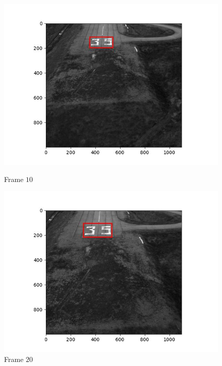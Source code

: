 \begin{figure}[H]
\begin{minipage}{.49\textwidth}
    \includegraphics[width=\textwidth]{./figures/lk_affine/landing/frame000040.jpg}
    \caption{Frame $10$}
  \end{minipage}
  \hfill
  \begin{minipage}{.49\textwidth}
    \centering
    \includegraphics[width=\textwidth]{./figures/lk_affine/landing/frame000049.jpg}
    \caption{Frame $20$}
  \end{minipage}
\end{figure}


